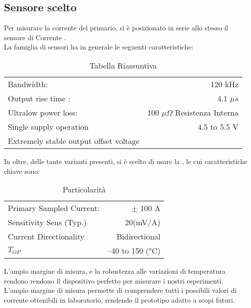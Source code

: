 \subsection{Sensore scelto}
Per misurare la corrente del primario, si è posizionato in serie allo stesso il sensore di Corrente \cite{ACS770}.\\
La famiglia di sensori ha in generale le seguenti caratteristiche:
\begin{table}[h]
	\centering
	\begin{tabular}[t]{|l r|}
		\hline
		Bandwidth:                             & 120 kHz                               \\
		Output rise time :                     & 4.1 $ \mu s $                         \\
		Ultralow power loss:                   & 100 $ \mu \Omega $ Resistenza Interna \\
		Single supply operation                & 4.5 to 5.5 V                          \\
		Extremely stable output offset voltage &                                       \\
		\hline
	\end{tabular}
	\caption[\cite{ACS770} Tabella Riassuntiva]{Tabella Riassuntiva}
\end{table}

\noindent
In oltre, delle tante varianti presenti, si è scelto di usare la , le cui caratteristiche chiave sono:

\begin{table}[h]
	\centering
	\begin{tabular}[t]{|l r|}
		\hline
		Primary Sampled Current: & $\pm$ 100 A     \\
		Sensitivity Sens (Typ.)  & 20(mV/A)        \\
		Current Directionality   & Bidirectional   \\
		$T_{OP}$                 & –40 to 150 (°C) \\
		\hline
	\end{tabular}
	\caption[ Particolarità]{ Particolarità}
\end{table}

\noindent
L'ampio margine di misura, e la robustezza alle variazioni di temperatura rendono rendono il dispositivo perfetto per misurare i nostri esperimenti.\\
L'ampio margine di misura permette di comprendere tutti i possibili valori di corrente ottenibili in laboratorio, rendendo il prototipo adatto a scopi futuri.
